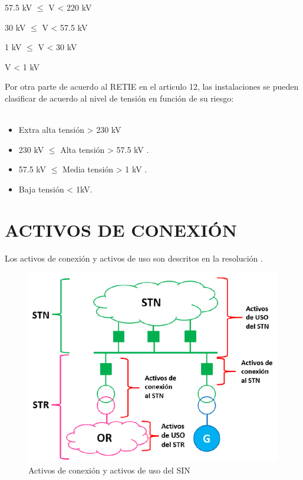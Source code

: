 \documentclass[a5paper]{book}%
\begin{document}
\begin{center}

  \begin{tcolorbox}[ title=SDL:Nivel de tensión 4]
    {57.5 kV $\leq$ V < 220 kV }
\end{tcolorbox}

  \begin{tcolorbox}[ title=SDL:Nivel de tensión 3]
    {30 kV $\leq$ V < 57.5 kV }
\end{tcolorbox}
\begin{tcolorbox}[ title=SDL:Nivel de tensión 2]
  { 1 kV $\leq$ V < 30 kV }
  \end{tcolorbox}
\begin{tcolorbox}[ title=SDL:Nivel de tensión 1]
  { V < 1 kV }
  \end{tcolorbox}
\end{center}

Por otra parte de acuerdo  al \ac{RETIE} \cite{RETIE2013} en el articulo 12, las instalaciones se pueden clasificar de acuerdo al nivel de tensión en función de su riesgo:\\\\
\begin{itemize}
\item Extra alta tensión > 230 kV
\item  230 kV  $\leqslant$ Alta tensión  > 57.5 kV .
\item 57.5 kV  $\leqslant$ Media tensión  > 1 kV .
\item Baja tensión < 1kV.
\end{itemize}

\section{ACTIVOS DE CONEXIÓN}

Los activos de conexión y activos de uso son descritos en  la resolución \cite{CREG0972008}. 

\begin{figure}[H]
  \centering
  \caption{Activos de conexión y activos de uso del \ac{SIN}}
  \label{fig:activosdeuso}
  \includegraphics[width=\linewidth]{activos_de_conexion}
\end{figure}
\end{document}
